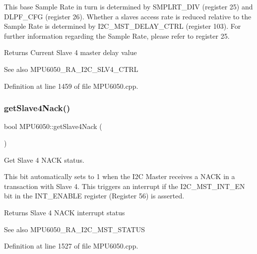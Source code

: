 This base Sample Rate in turn is determined by S\+M\+P\+L\+R\+T\+\_\+\+D\+IV (register 25) and D\+L\+P\+F\+\_\+\+C\+FG (register 26). Whether a slave\textquotesingle{}s access rate is reduced relative to the Sample Rate is determined by I2\+C\+\_\+\+M\+S\+T\+\_\+\+D\+E\+L\+A\+Y\+\_\+\+C\+T\+RL (register 103). For further information regarding the Sample Rate, please refer to register 25.

\begin{DoxyReturn}{Returns}
Current Slave 4 master delay value 
\end{DoxyReturn}
\begin{DoxySeeAlso}{See also}
M\+P\+U6050\+\_\+\+R\+A\+\_\+\+I2\+C\+\_\+\+S\+L\+V4\+\_\+\+C\+T\+RL 
\end{DoxySeeAlso}


Definition at line 1459 of file M\+P\+U6050.\+cpp.

\mbox{\label{classMPU6050_ae9882b425cbdced4de325b608d896e10}} 
\subsubsection{\texorpdfstring{getSlave4Nack()}{getSlave4Nack()}}
{\footnotesize\ttfamily bool M\+P\+U6050\+::get\+Slave4\+Nack (\begin{DoxyParamCaption}{ }\end{DoxyParamCaption})}



Get Slave 4 N\+A\+CK status. 

This bit automatically sets to 1 when the I2C Master receives a N\+A\+CK in a transaction with Slave 4. This triggers an interrupt if the I2\+C\+\_\+\+M\+S\+T\+\_\+\+I\+N\+T\+\_\+\+EN bit in the I\+N\+T\+\_\+\+E\+N\+A\+B\+LE register (Register 56) is asserted. \begin{DoxyReturn}{Returns}
Slave 4 N\+A\+CK interrupt status 
\end{DoxyReturn}
\begin{DoxySeeAlso}{See also}
M\+P\+U6050\+\_\+\+R\+A\+\_\+\+I2\+C\+\_\+\+M\+S\+T\+\_\+\+S\+T\+A\+T\+US 
\end{DoxySeeAlso}


Definition at line 1527 of file M\+P\+U6050.\+cpp.

\mbox{\label{classMPU6050_a7bd548cb60ecceb27c72f026ec0a60f8}} 
